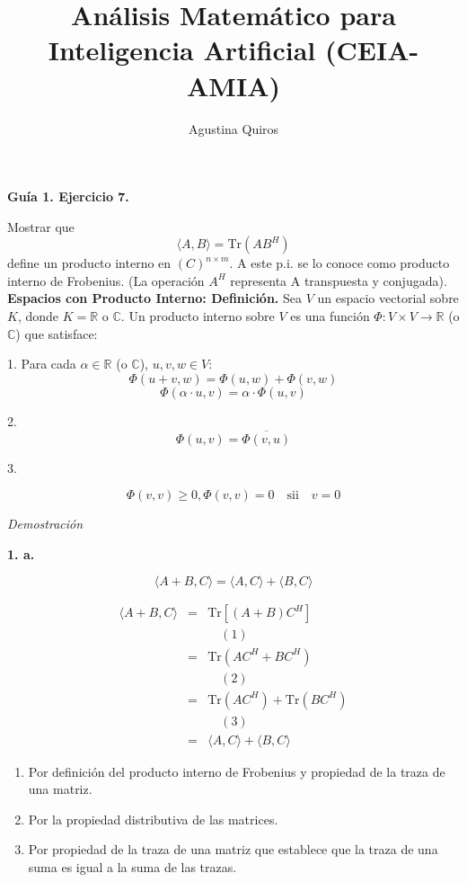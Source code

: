 \documentclass{article}
\title{\bf Análisis Matemático para Inteligencia Artificial (CEIA-AMIA)}
\author{Agustina Quiros}
\begin{document}
\maketitle

{\bfseries Guía 1. Ejercicio 7.} 

Mostrar que 
\[
\langle A, B \rangle = \text{Tr}(AB^H)
\]
define un producto interno en $(C)^{n \times m}$. A este p.i. se lo conoce como producto
interno de Frobenius. (La operación $A^H$ representa A transpuesta y conjugada). \\

{\bfseries Espacios con Producto Interno: Definición.} 
Sea \( V \) un espacio vectorial sobre \( K \), donde \( K = \mathbb{R} \) o \( \mathbb{C} \). Un producto interno sobre \( V \) es una función \(\Phi : V \times V \to \mathbb{R} \) (o \(\mathbb{C}\)) que satisface:

1. Para cada \(\alpha \in \mathbb{R}\) (o \(\mathbb{C}\)), \( u, v, w \in V \):
\[
\Phi(u + v, w) = \Phi(u, w) + \Phi(v, w)
\]
\[
\Phi(\alpha \cdot u, v) = \alpha \cdot \Phi(u, v)
\]

2. 
\[
\Phi(u, v) = \overline{\Phi(v, u)}
\]

3. 

\[
\Phi(v, v) \geq 0,\Phi(v, v) = 0 \quad \text{sii} \quad v = 0
\]


\textit{Demostración}

\textbf{1. a.}

\[
    \langle A + B, C \rangle = \langle A, C \rangle + \langle B, C \rangle
\]

\[
\begin{array}{rcl}
\langle A + B, C \rangle & = & \text{Tr}[(A + B)C^H] \\
                         &   & \quad (\text{1}) \\
                         & = & \text{Tr}(AC^H + BC^H) \\
                         &   & \quad (\text{2}) \\
                         & = & \text{Tr}(AC^H) + \text{Tr}(BC^H) \\
                         &   & \quad (\text{3}) \\
                         & = & \langle A, C \rangle + \langle B, C \rangle
\end{array}
\]
\begin{enumerate}
    \item Por definición del producto interno de Frobenius y propiedad de la traza de una matriz.
    \item Por la propiedad distributiva de las matrices.
    \item Por propiedad de la traza de una matriz que establece que la traza de una suma es igual a la suma de las trazas.
\end{enumerate}
\end{document}
